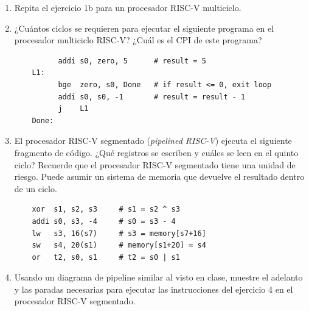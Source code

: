 \documentclass[letterpaper,12pt]{article}
\begin{document}
\begin{enumerate}
    \begin{enumerate}[label=\alph*)]
        \item ¿En qué unidad debería trabajar para obtener la mayor aceleración del procesador general?
        \item ¿Cuál sería el tiempo de ciclo de la máquina mejorada? Explique.
    \end{enumerate}

    \vspace{0.6cm}

    \item Repita el ejercicio 1b para un procesador RISC-V multiciclo.

    \vspace{0.5cm}

    \item ¿Cuántos ciclos se requieren para ejecutar el siguiente programa en el procesador multiciclo RISC-V? ¿Cuál es el CPI de este programa?

    \begin{verbatim}
          addi s0, zero, 5      # result = 5
    L1:
          bge  zero, s0, Done   # if result <= 0, exit loop
          addi s0, s0, -1       # result = result - 1
          j    L1
    Done:
    \end{verbatim}

    \vspace{0.5cm}

    \item El procesador RISC-V segmentado (\textit{pipelined RISC-V}) ejecuta el siguiente fragmento de código. ¿Qué registros se escriben y cuáles se leen en el quinto ciclo? Recuerde que el procesador RISC-V segmentado tiene una unidad de riesgo. Puede asumir un sistema de memoria que devuelve el resultado dentro de un ciclo.

    \begin{verbatim}
    xor  s1, s2, s3     # s1 = s2 ^ s3
    addi s0, s3, -4     # s0 = s3 - 4
    lw   s3, 16(s7)     # s3 = memory[s7+16]
    sw   s4, 20(s1)     # memory[s1+20] = s4
    or   t2, s0, s1     # t2 = s0 | s1
    \end{verbatim}

    \vspace{0.5cm}

    \item Usando un diagrama de pipeline similar al visto en clase, muestre el adelanto y las paradas necesarias para ejecutar las instrucciones del ejercicio 4 en el procesador RISC-V segmentado.


\end{enumerate}
\end{document}
